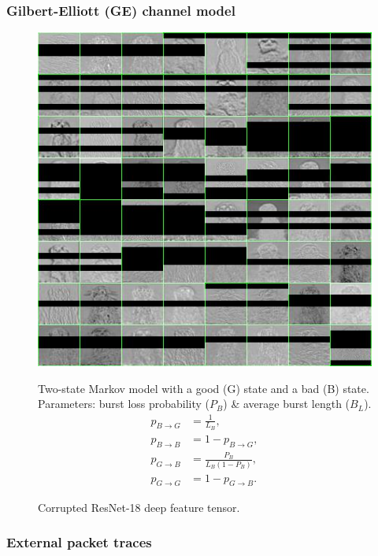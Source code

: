\documentclass[aspectratio=169]{beamer}
\begin{document}
\begin{frame}
\frametitle{Gilbert-Elliott (GE) channel model}
    	\begin{figure}
		\begin{minipage}{.48\textwidth}
		\centering
			\includegraphics[width=0.8\linewidth]{tileddamagedgridm.jpg}
			\caption{Corrupted ResNet-18 deep feature tensor.}
		\end{minipage}\hfill
		\begin{minipage}{.48\textwidth}
			Two-state Markov model with a good (G) state and a bad (B) state. Parameters: burst loss probability ($P_B$) \& average burst length ($B_L$).
			\begin{equation}
			\begin{split}
			p_{B\to G} & = \frac{1}{L_B},\\
			p_{B\to B} & =1-p_{B\to G},\\
			p_{G\to B} & = \frac{P_B}{L_B(1-P_B)},\\
			p_{G\to G} & = 1-p_{G\to B}.
			\end{split}
			\end{equation} 
		\end{minipage}
	\end{figure}
\end{frame}

\begin{frame}
\frametitle{External packet traces}
    
\end{frame}
\end{document}
